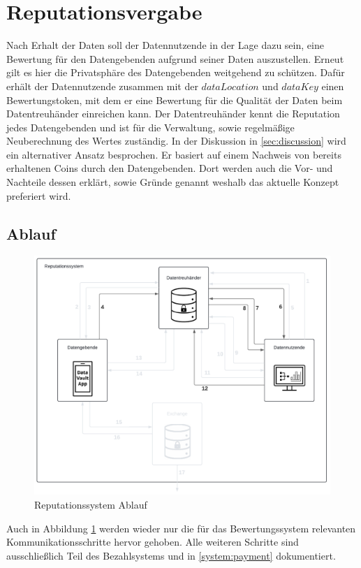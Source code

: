 \documentclass{scrreprt}
\begin{document}
\section{Reputationsvergabe}
Nach Erhalt der Daten soll der Datennutzende in der Lage dazu sein, eine Bewertung für den Datengebenden aufgrund seiner Daten auszustellen. Erneut gilt es hier die Privatsphäre des Datengebenden weitgehend zu schützen. Dafür erhält der Datennutzende zusammen mit der $dataLocation$ und $dataKey$ einen Bewertungstoken, mit dem er eine Bewertung für die Qualität der Daten beim Datentreuhänder einreichen kann. Der Datentreuhänder kennt die Reputation jedes Datengebenden und ist für die Verwaltung, sowie regelmäßige Neuberechnung des Wertes zuständig.
In der Diskussion in \ref{sec:discussion} wird ein alternativer Ansatz besprochen. Er basiert auf einem Nachweis von bereits erhaltenen Coins durch den Datengebenden. Dort werden auch die Vor- und Nachteile dessen erklärt, sowie Gründe genannt weshalb das aktuelle Konzept preferiert wird.
\label{system:reputation}
\subsection{Ablauf}
\begin{figure}[H]
    \centering
    \includegraphics[width=0.9\linewidth]{ReputationDiagramm.pdf}
    \caption{Reputationssystem Ablauf}
    \label{fig:reputation}
\end{figure}

Auch in Abbildung \ref{fig:reputation} werden wieder nur die für das Bewertungssystem relevanten Kommunikationsschritte hervor gehoben. Alle weiteren Schritte sind ausschließlich Teil des Bezahlsystems und in \ref{system:payment} dokumentiert.
\end{document}
